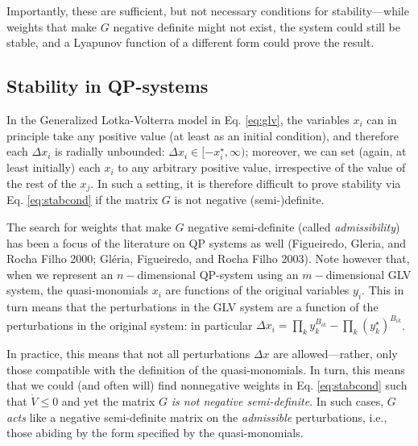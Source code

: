 \documentclass{article}
\begin{document}
Importantly, these are sufficient, but not necessary conditions for
stability---while weights that make \(G\) negative definite might not
exist, the system could still be stable, and a Lyapunov function of a
different form could prove the result.

\hypertarget{stability-in-qp-systems}{%
\subsection{Stability in QP-systems}\label{stability-in-qp-systems}}

In the Generalized Lotka-Volterra model in Eq. \ref{eq:glv}, the
variables \(x_i\) can in principle take any positive value (at least as
an initial condition), and therefore each \(\Delta x_i\) is radially
unbounded: \(\Delta x_i \in [-x_i^\star, \infty)\); moreover, we can set
(again, at least initially) each \(x_i\) to any arbitrary positive
value, irrespective of the value of the rest of the \(x_j\). In such a
setting, it is therefore difficult to prove stability via Eq.
\ref{eq:stabcond} if the matrix \(G\) is not negative (semi-)definite.

The search for weights that make \(G\) negative semi-definite (called
\emph{admissibility}) has been a focus of the literature on QP systems
as well (Figueiredo, Gleria, and Rocha Filho 2000; Gléria, Figueiredo,
and Rocha Filho 2003). Note however that, when we represent an
\(n-\)dimensional QP-system using an \(m-\)dimensional GLV system, the
quasi-monomials \(x_i\) are functions of the original variables \(y_i\).
This in turn means that the perturbations in the GLV system are a
function of the perturbations in the original system: in particular
\(\Delta x_i = \prod_{k} y_k^{B_{ik}} - \prod_{k} (y_k^\star)^{B_{ik}}\).

In practice, this means that not all perturbations \(\Delta x\) are
allowed---rather, only those compatible with the definition of the
quasi-monomials. In turn, this means that we could (and often will) find
nonnegative weights in Eq. \ref{eq:stabcond} such that
\(\dot{V} \leq 0\) and yet the matrix \(G\) \emph{is not negative
semi-definite}. In such cases, \(G\) \emph{acts} like a negative
semi-definite matrix on the \emph{admissible} perturbations, i.e., those
abiding by the form specified by the quasi-monomials.
\end{document}
